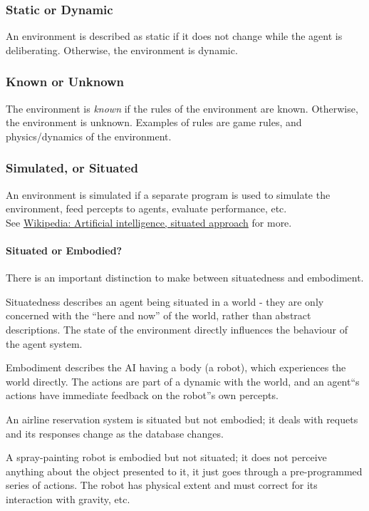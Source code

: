 \subsubsection{Static or Dynamic}
An environment is described as static if it does not change while the agent is
deliberating. Otherwise, the environment is dynamic.

\subsubsection{Known or Unknown}
The environment is \textit{known} if the rules of the environment are known.
Otherwise, the environment is unknown. Examples of rules are game rules, and
physics/dynamics of the environment.

\subsubsection{Simulated, or Situated}
An environment is simulated if a separate program is used to simulate the
environment, feed percepts to agents, evaluate performance, etc.\\
See
\href{http://en.wikipedia.org/wiki/Artificial_intelligence,_situated_approach}{Wikipedia:
Artificial intelligence, situated approach} for more.

\paragraph{Situated or Embodied?}
There is an important distinction to make between situatedness and
embodiment.

Situatedness describes an agent being situated in a world - they are only
concerned with the ``here and now'' of the world, rather than abstract
descriptions. The state of the environment directly influences the behaviour of
the agent system.

Embodiment describes the AI having a body (a robot), which experiences the
world directly. The actions are part of a dynamic with the world, and an
agent``s actions have immediate feedback on the robot''s own percepts.

An airline reservation system is situated but not embodied; it deals with
requets and its responses change as the database changes.

A spray-painting robot is embodied but not situated; it does not perceive
anything about the object presented to it, it just goes through a
pre-programmed series of actions. The robot has physical extent and must
correct for its interaction with gravity, etc.

